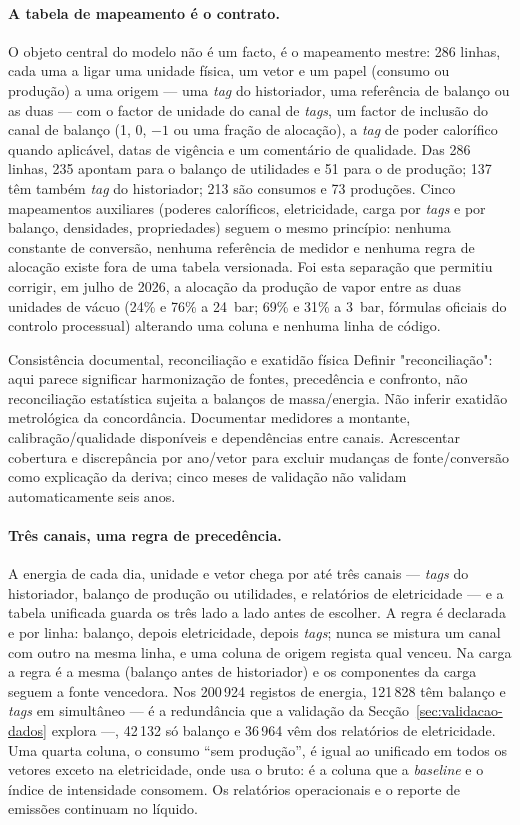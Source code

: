 \paragraph{A tabela de mapeamento é o contrato.} O objeto central do
modelo não é um facto, é o mapeamento mestre: 286 linhas, cada uma a
ligar uma unidade física, um vetor e um papel (consumo ou produção) a
uma origem --- uma \emph{tag} do historiador, uma referência de balanço
ou as duas --- com o factor de unidade do canal de \emph{tags}, um factor
de inclusão do canal de balanço (1, 0, $-1$ ou uma fração de alocação),
a \emph{tag} de poder calorífico quando aplicável, datas de vigência e um
comentário de qualidade. Das 286 linhas, 235 apontam para o balanço de
utilidades e 51 para o de produção; 137 têm também \emph{tag} do
historiador; 213 são consumos e 73 produções. Cinco mapeamentos auxiliares
(poderes caloríficos, eletricidade, carga por \emph{tags} e por balanço,
densidades, propriedades) seguem o mesmo princípio: nenhuma constante de
conversão, nenhuma referência de medidor e nenhuma regra de alocação
existe fora de uma tabela versionada. Foi esta separação que permitiu
corrigir, em julho de 2026, a alocação da produção de vapor entre as duas
unidades de vácuo (24\% e 76\% a 24~bar; 69\% e 31\% a 3~bar, fórmulas
oficiais do controlo processual) alterando uma coluna e nenhuma linha de
código.

{Consistência documental, reconciliação e exatidão física}
{Definir "reconciliação": aqui parece significar harmonização de fontes,
precedência e confronto, não reconciliação estatística sujeita a balanços
de massa/energia. Não inferir exatidão metrológica da concordância.
Documentar medidores a montante, calibração/qualidade disponíveis e
dependências entre canais. Acrescentar cobertura e discrepância por
ano/vetor para excluir mudanças de fonte/conversão como explicação da
deriva; cinco meses de validação não validam automaticamente seis anos.}%
\paragraph{Três canais, uma regra de precedência.} A energia de cada
dia, unidade e vetor chega por até três canais --- \emph{tags} do
historiador, balanço de produção ou utilidades, e relatórios de
eletricidade --- e a tabela unificada guarda os três lado a lado antes de
escolher. A regra é declarada e por linha: balanço, depois eletricidade,
depois \emph{tags}; nunca se mistura um canal com outro na mesma linha, e
uma coluna de origem regista qual venceu. Na carga a regra é a mesma
(balanço antes de historiador) e os componentes da carga seguem a fonte
vencedora. Nos 200\,924 registos de energia, 121\,828 têm balanço e
\emph{tags} em simultâneo --- é a redundância que a validação da
Secção~\ref{sec:validacao-dados} explora ---, 42\,132 só balanço e 36\,964
vêm dos relatórios de eletricidade. Uma quarta coluna, o consumo ``sem
produção'', é igual ao unificado em todos os vetores exceto na
eletricidade, onde usa o bruto: é a coluna que a \emph{baseline} e o índice
de intensidade consomem. Os relatórios operacionais e o reporte de
emissões continuam no líquido.

